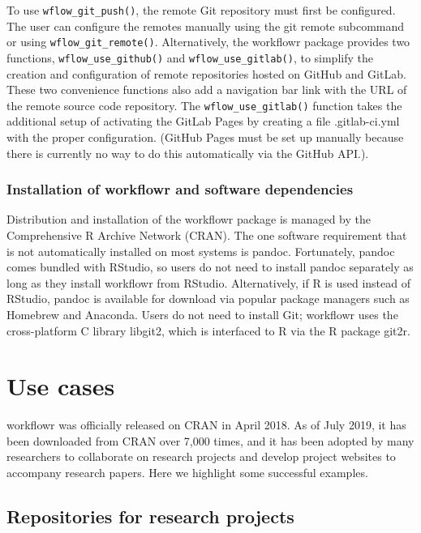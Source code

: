 \documentclass[9pt,a4paper]{extarticle}
\begin{document}
To use \texttt{wflow\_git\_push()}, the remote Git repository must first be
configured. The user can configure the remotes manually using the git
remote subcommand or using \texttt{wflow\_git\_remote()}. Alternatively, the
workflowr package provides two functions, \texttt{wflow\_use\_github()} and
\texttt{wflow\_use\_gitlab()}, to simplify the creation and configuration of remote
repositories hosted on GitHub and GitLab. These two convenience
functions also add a navigation bar link with the URL of the remote
source code repository. The \texttt{wflow\_use\_gitlab()} function takes the
additional setup of activating the GitLab Pages by creating a file
.gitlab-ci.yml with the proper configuration. (GitHub Pages must be set
up manually because there is currently no way to do this automatically
via the GitHub API.).

\subsubsection*{Installation of workflowr and software dependencies}

Distribution and installation of the workflowr package is managed by the
Comprehensive R Archive Network (CRAN). The one software requirement
that is not automatically installed on most systems is pandoc.
Fortunately, pandoc comes bundled with RStudio, so users do not need to
install pandoc separately as long as they install workflowr from
RStudio. Alternatively, if R is used instead of RStudio, pandoc is
available for download via popular package managers such as Homebrew and
Anaconda. Users do not need to install Git; workflowr uses the
cross-platform C library libgit2, which is interfaced to R via the R
package git2r.


\section*{Use cases}

workflowr was officially released on CRAN in April 2018. As of July
2019, it has been downloaded from CRAN over 7,000 times, and it has been
adopted by many researchers to collaborate on research projects and
develop project websites to accompany research papers. Here we highlight
some successful examples.

\subsection*{Repositories for research projects}
\end{document}
